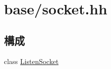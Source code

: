 \hypertarget{socket_8hh}{
\section{base/socket.hh}
\label{socket_8hh}
}
\subsection*{構成}
\begin{DoxyCompactItemize}
\item 
class \hyperlink{classListenSocket}{ListenSocket}
\end{DoxyCompactItemize}
